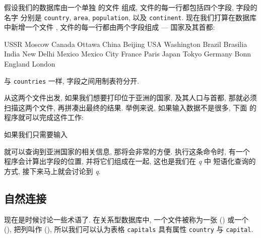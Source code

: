 假设我们的数据库由一个单独
的文件  组成, 文件的每一行都包括四个字段, 字段的名字
分别是 \verb'country', \verb'area', \verb'population', 以及
\verb'continent'. 现在我们打算在数据库中新增一个文件 ,
文件的每一行都由两个字段组成 --- 国家及其首都:
\begin{awkcode}
    USSR    Moscow
    Canada  Ottawa
    China   Beijing
    USA     Washington
    Brazil  Brasilia
    India   New Delhi
    Mexico  Mexico City
    France  Paris
    Japan   Tokyo
    Germany Bonn
    England London
\end{awkcode}
与 \verb'countries' 一样, 字段之间用制表符分开.

从这两个文件出发, 如果我们想要打印位于亚洲的国家, 及其人口与首都, 那就必须
扫描这两个文件, 再拼凑出最终的结果. 举例来说, 如果输入数据不是很多, 下面
的程序就可以完成这件工作:

如果我们只需要输入
就可以查询到亚洲国家的相关信息, 那将会非常的方便. 执行这条命令时, 有一个
程序会计算出字段的位置, 并将它们组成在一起, 这也是我们在 \textit{q} 中
短语化查询的方式, 接下来马上就会讨论到 \textit{q}.

\subsection{自然连接}
\label{subsec:natural_joins}

现在是时候讨论一些术语了. 在关系型数据库中, 一个文件被称为一张  
() 或一个  (), 把列叫作 
(), 所以我们可以认为表格 \verb'capitals' 具有属性
\verb'country' 与 \verb'capital'.

